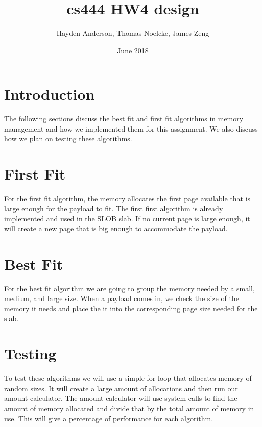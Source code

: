 \documentclass{article}
\title{cs444 HW4 design}
\author{Hayden Anderson, Thomas Noelcke, James Zeng }
\date{June 2018}
\begin{document}
\maketitle 

\section{Introduction}
The following sections discuss the best fit and first fit algorithms in memory management and how we implemented them for this assignment. We also discuss how we plan on testing these algorithms.\\

\section{First Fit}
For the first fit algorithm, the memory allocates the first page available that is large enough for the payload to fit. The first first algorithm is already implemented and used in the SLOB slab. If no current page is large enough, it will create a new page that is big enough to accommodate the payload.\\

\section{Best Fit}
For the best fit algorithm we are going to group the memory needed by a small, medium, and large size. When a payload comes in, we check the size of the memory it needs and place the it into the corresponding page size needed for the slab.\\

\section{Testing}
To test these algorithms we will use a simple for loop that allocates memory of random sizes. It will create a large amount of allocations and then run our amount calculator. The amount calculator will use system calls to find the amount of memory allocated and divide that by the total amount of memory in use. This will give a percentage of performance for each algorithm.\\
\end{document}
